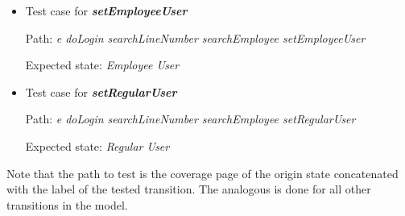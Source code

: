 \begin{itemize}

\item Test case for \textit{\textbf{setEmployeeUser}}

Path: \textit{e doLogin searchLineNumber searchEmployee setEmployeeUser}

Expected state: \textit{Employee User}

\item Test case for \textit{\textbf{setRegularUser}}

Path: \textit{e doLogin searchLineNumber searchEmployee setRegularUser}

Expected state: \textit{Regular User}
\end{itemize}

Note that the path to test is the coverage page of the origin state concatenated with the label of the tested transition. The analogous is done for all other transitions in the model.

